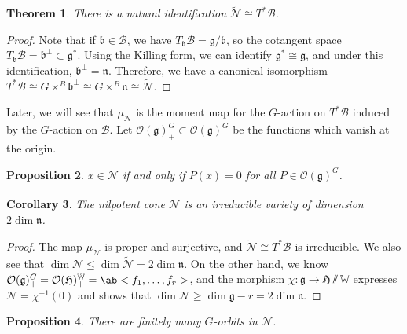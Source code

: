 \documentclass{amsart}
\newtheorem{thm}{Theorem}[section]
\newtheorem{cor}[thm]{Corollary}
\newtheorem{prop}[thm]{Proposition}
\theoremstyle{definition}
\theoremstyle{remark}
\theoremstyle{plain}
\theoremstyle{definition}
\theoremstyle{remark}
\newcommand{\g}{\mathfrak{g}}
\newcommand{\n}{\mathfrak{n}}
\renewcommand{\b}{\mathfrak{b}}
\newcommand{\mc}[1]{\mathcal{#1}}
\newcommand{\mf}[1]{\mathfrak{#1}}
\newcommand{\mbb}[1]{\mathbb{#1}}
\newcommand{\1}{\mathbf{1}}
\newcommand{\2}{\mathbf{2}}
\newcommand{\3}{\mathbf{3}}
\begin{document}
\begin{thm}
    There is a natural identification \(\tilde{\mc{N}} \cong T^* \mc{B}\).
\end{thm}

\begin{proof}
    Note that if \(\b \in \mc{B}\), we have \(T_{\b} \mc{B} = \g / \b\), so the cotangent space \(T_{\b} \mc{B} = \b^{\perp} \subset \g^*\). Using the Killing form, we can identify \(\g^* \cong \g\), and under this identification, \(\b^{\perp} = \n\). Therefore, we have a canonical isomorphism \(T^* \mc{B} \cong G \times^B \b^{\perp} \cong G \times^B \n \cong \tilde{\mc{N}}\). 
\end{proof}

Later, we will see that \(\mu_{\mc{N}}\) is the moment map for the \(G\)-action on \(T^* \mc{B}\) induced by the \(G\)-action on \(\mc{B}\). Let \(\mc{O}(\g)_+^G \subset \mc{O}(\g)^G\) be the functions which vanish at the origin.

\begin{prop}
    \(x \in \mc{N}\) if and only if \(P(x) = 0\) for all \(P \in \mc{O}(\g)_+^G\).
\end{prop}

\begin{cor}
    The nilpotent cone \(\mc{N}\) is an irreducible variety of dimension \(2 \dim \n\).
\end{cor}

\begin{proof}
    The map \(\mu_{\mc{N}}\) is proper and surjective, and \(\tilde{\mc{N}} \cong T^* \mc{B}\) is irreducible. We also see that \(\dim \mc{N} \leq \dim \tilde{\mc{N}} = 2 \dim \n\). On the other hand, we know \(\mc{O}(\g)_+^G = \mc{O}(\mf{H})_+^{\mbb{W}} = \ab< f_1, \ldots, f_r>\), and the morphism \(\chi \colon \g \to \mf{H} \sslash \mbb{W}\) expresses \(\mc{N} = \chi^{-1}(0)\) and shows that \(\dim \mc{N} \geq \dim \g - r = 2 \dim \n\).
\end{proof}

\begin{prop}
    There are finitely many \(G\)-orbits in \(\mc{N}\).
\end{prop}
\end{document}
